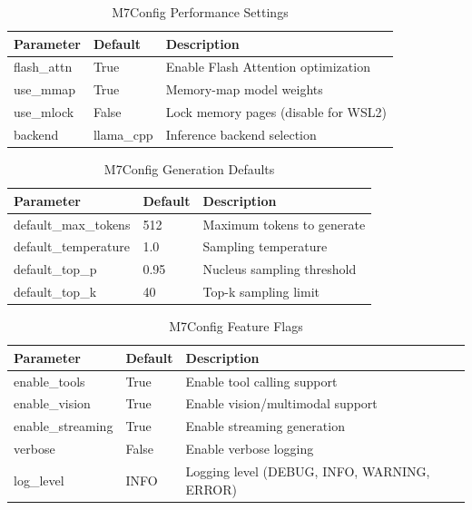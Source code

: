 \begin{table}[h]
\centering
\caption{M7Config Performance Settings}
\label{tab:m7config_perf}
\begin{tabular}{lll}
\toprule
\textbf{Parameter} & \textbf{Default} & \textbf{Description} \\
\midrule
flash\_attn & True & Enable Flash Attention optimization \\
use\_mmap & True & Memory-map model weights \\
use\_mlock & False & Lock memory pages (disable for WSL2) \\
backend & llama\_cpp & Inference backend selection \\
\bottomrule
\end{tabular}
\end{table}

\begin{table}[h]
\centering
\caption{M7Config Generation Defaults}
\label{tab:m7config_gen}
\begin{tabular}{lll}
\toprule
\textbf{Parameter} & \textbf{Default} & \textbf{Description} \\
\midrule
default\_max\_tokens & 512 & Maximum tokens to generate \\
default\_temperature & 1.0 & Sampling temperature \\
default\_top\_p & 0.95 & Nucleus sampling threshold \\
default\_top\_k & 40 & Top-k sampling limit \\
\bottomrule
\end{tabular}
\end{table}

\begin{table}[h]
\centering
\caption{M7Config Feature Flags}
\label{tab:m7config_features}
\begin{tabular}{lll}
\toprule
\textbf{Parameter} & \textbf{Default} & \textbf{Description} \\
\midrule
enable\_tools & True & Enable tool calling support \\
enable\_vision & True & Enable vision/multimodal support \\
enable\_streaming & True & Enable streaming generation \\
verbose & False & Enable verbose logging \\
log\_level & INFO & Logging level (DEBUG, INFO, WARNING, ERROR) \\
\bottomrule
\end{tabular}
\end{table}

